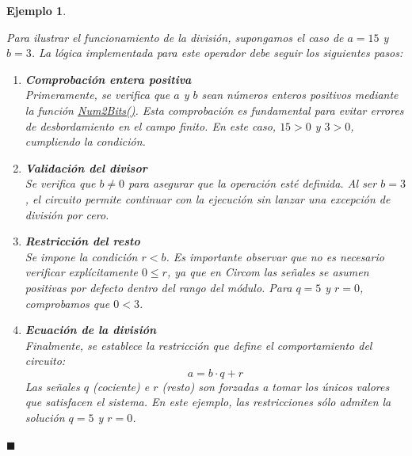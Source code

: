 \documentclass[a4paper,12pt]{report}
\newtheorem{ejemplo}{Ejemplo}
\begin{document}
	
	\begin{ejemplo}
		\label{ex:teorema-division}
		\vspace{0.2cm} %
		
		\vspace{0.3cm}
		\noindent 
		Para ilustrar el funcionamiento de la división, supongamos el caso de $a = 15$ y $b = 3$. La lógica implementada para este operador debe seguir los siguientes pasos:
		
		\begin{enumerate}[label=\textbf{\arabic*.}, leftmargin=*, itemsep=1.2em, parsep=0.5em]
			
			
			\item \textbf{Comprobación entera positiva} \\
			Primeramente, se verifica que $a$ y $b$ sean números enteros positivos mediante la función \hyperref[cod:num2bits]{\textit{Num2Bits()}}. Esta comprobación es fundamental para evitar errores de desbordamiento en el campo finito. En este caso, $15 > 0$ y $3 > 0$, cumpliendo la condición.
			
			\item \textbf{Validación del divisor} \\
			Se verifica que $b \neq 0$ para asegurar que la operación esté definida. Al ser $b = 3$, el circuito permite continuar con la ejecución sin lanzar una excepción de división por cero.
			
			\item \textbf{Restricción del resto} \\
			Se impone la condición $r < b$. Es importante observar que no es necesario verificar explícitamente $0 \leq r$, ya que en Circom las señales se asumen positivas por defecto dentro del rango del módulo. Para $q = 5$ y $r = 0$, comprobamos que $0 < 3$.
			
			\item \textbf{Ecuación de la división} \\
			Finalmente, se establece la restricción que define el comportamiento del circuito:
			\begin{equation*}
				a = b \cdot q + r
			\end{equation*}
			Las señales $q$ (cociente) e $r$ (resto) son forzadas a tomar los únicos valores que satisfacen el sistema. En este ejemplo, las restricciones sólo admiten la solución $q = 5$ y $r = 0$.
		\end{enumerate}
		
		\vspace{0.3cm}
		\hspace*{\fill} $\blacksquare$
	\end{ejemplo}
	
\end{document}
